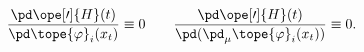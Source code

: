 \begin{equation*}
\frac{\pd \ope[\prime]{H}(t)}{\pd \tope{\varphi}_i(x_t)} \equiv 0
\qquad
\frac{\pd \ope[\prime]{H}(t)}{\pd (\pd_\mu\tope{\varphi}_i(x_t))} \equiv 0 .
	\end{equation*}

